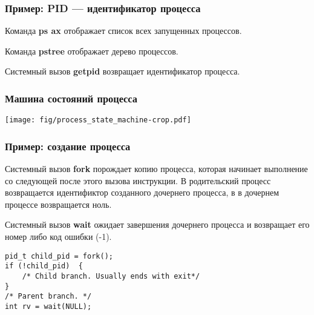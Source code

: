 \documentclass{beamer}
\begin{document}
\begin{frame}[fragile]
    \frametitle{Пример: PID --- идентификатор процесса}
    Команда {\bf ps ax} отображает список всех запущенных процессов.

    Команда {\bf pstree} отображает дерево процессов.

    Системный вызов {\bf getpid} возвращает идентификатор процесса.
    
\end{frame}


\begin{frame}
    \frametitle{Машина состояний процесса}
        \texttt{[image: fig/process\_state\_machine-crop.pdf]}
\end{frame}

\begin{frame}[fragile]
    \frametitle{Пример: создание процесса}
    Системный вызов {\bf fork} порождает копию процесса, которая начинает выполнение
    со следующей после этого вызова инструкции. В родительский процесс возвращается идентификтор созданного дочернего процесса, в в дочернем процессе возвращается ноль.

    Системный вызов {\bf wait} ожидает завершения дочернего процесса и возвращает его номер либо код ошибки (-1).
\begin{verbatim}
pid_t child_pid = fork();
if (!child_pid)  {
    /* Child branch. Usually ends with exit*/
} 
/* Parent branch. */
int rv = wait(NULL);
\end{verbatim}
\end{frame}
\end{document}
